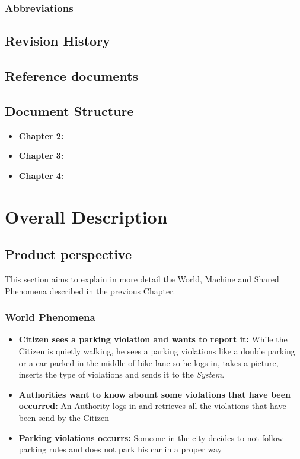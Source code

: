 \documentclass{article}
\begin{document}
\subsubsection{Abbreviations}

\subsection{Revision History}

\subsection{Reference documents}

\subsection{Document Structure}
\begin{itemize}
    \item \textbf{Chapter 2:}
    \item \textbf{Chapter 3:}
    \item \textbf{Chapter 4:}  
\end{itemize}

\section{Overall Description}

\subsection{Product perspective}
This section aims to explain in more detail the World, Machine and Shared Phenomena described in the 
previous Chapter. 
\subsubsection{World Phenomena}
\begin{itemize}
    \item \textbf{Citizen sees a parking violation and wants to report it:}
    While the Citizen is quietly walking, he sees a parking violations like a double parking or a car
    parked in the middle of bike lane so he logs in, takes a picture, inserts the type of violations
    and sends it to the \textit{System}.  
    \item \textbf{Authorities want to know abount some violations that have been occurred:}
    An Authority logs in and retrieves all the violations that have been send by the Citizen 
    \item \textbf{Parking violations occurrs:}
    Someone in the city decides to not follow parking rules and does not park his car in a proper way   
\end{itemize}
\end{document}
